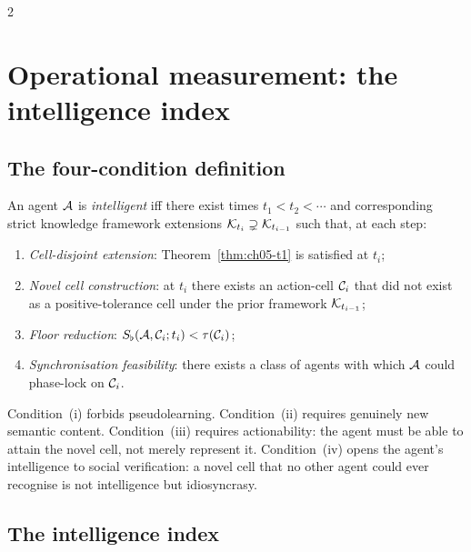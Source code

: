 \begin{multicols}{2}

\section{Operational measurement: the intelligence index}
\label{sec:ch05-index}

\subsection{The four-condition definition}

\begin{definition}[Intelligence]\label{def:ch05-intelligence}
An agent $\mathcal{A}$ is \emph{intelligent} iff there exist times $t_1 < t_2 < \cdots$ and
corresponding strict knowledge framework extensions
$\mathcal{K}_{t_i} \supsetneq \mathcal{K}_{t_{i-1}}$ such that, at each step:
\begin{enumerate}[label=(\roman*)]
\item \emph{Cell-disjoint extension}: Theorem~\ref{thm:ch05-t1} is satisfied at $t_i$;
\item \emph{Novel cell construction}: at $t_i$ there exists an action-cell $\mathcal{C}_i$
  that did not exist as a positive-tolerance cell under the prior framework
  $\mathcal{K}_{t_{i-1}}$;
\item \emph{Floor reduction}: $S_{\flat}(\mathcal{A}, \mathcal{C}_i; t_i) < \tau(\mathcal{C}_i)$;
\item \emph{Synchronisation feasibility}: there exists a class of agents with which
  $\mathcal{A}$ could phase-lock on $\mathcal{C}_i$.
\end{enumerate}
\end{definition}

Condition~(i) forbids pseudolearning. Condition~(ii) requires genuinely new semantic
content. Condition~(iii) requires actionability: the agent must be able to attain the
novel cell, not merely represent it. Condition~(iv) opens the agent's intelligence to
social verification: a novel cell that no other agent could ever recognise is not
intelligence but idiosyncrasy.

\subsection{The intelligence index}


\end{multicols}
